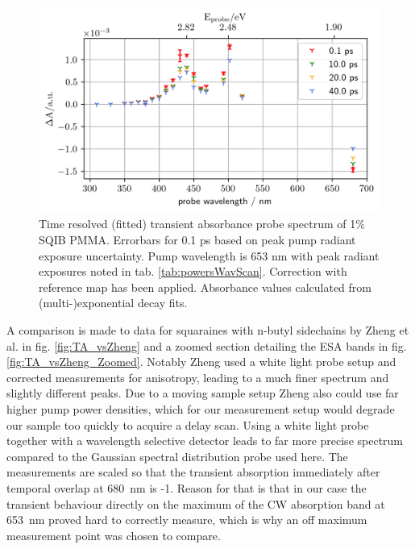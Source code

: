 \documentclass[twoside,openright]{scrreprt}
\begin{document}
{\begin{figure}[hbt]
\centering
\includegraphics[scale=1]{images/TimeResolvedWavelengthScanSQIB1perc_PMMA_mapCorrected.png}
\caption{Time resolved (fitted) transient absorbance probe spectrum of 1\% SQIB PMMA. Errorbars for 0.1 ps based on peak pump radiant exposure uncertainty. Pump wavelength is 653 nm with peak radiant exposures noted in tab. \ref{tab:powersWavScan}. Correction with reference map has been applied. Absorbance values calculated from (multi-)exponential decay fits.\label{fig:SQIB_PMMAwavelengthscan}}
\end{figure}

A comparison is made to data for squaraines with n-butyl sidechains by Zheng et al.\cite{Zheng2020} in fig. \ref{fig:TA_vsZheng} and a zoomed section detailing the ESA bands in fig. \ref{fig:TA_vsZheng_Zoomed}. Notably Zheng\cite{Zheng2020} used a white light probe setup and corrected measurements for anisotropy, leading to a much finer spectrum and slightly different peaks. Due to a moving sample setup Zheng also could use far higher pump power densities, which for our measurement setup would degrade our sample too quickly to acquire a delay scan. Using a white light probe together with a wavelength selective detector leads to far more precise spectrum compared to the Gaussian spectral distribution probe used here. The measurements are scaled so that the transient absorption immediately after temporal overlap at \SI{680}{\nano\meter} is -1. Reason for that is that in our case the transient behaviour directly on the maximum of the CW absorption band at \SI{653}{\nano\meter} proved hard to correctly measure, which is why an off maximum measurement point was chosen to compare.%

}
\end{document}
